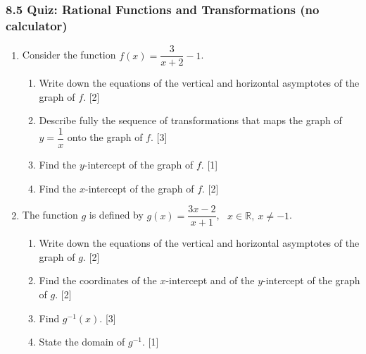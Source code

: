 \documentclass[12pt, twoside]{article}
\begin{document}
\newpage

\subsubsection*{8.5 Quiz: Rational Functions and Transformations (no calculator)}

\begin{enumerate}[itemsep=0.15cm]

\item[1.] [Maximum mark: 8]

Consider the function $f(x) = \dfrac{3}{x + 2} - 1$.

\begin{enumerate}[itemsep=0.15cm]
  \item Write down the equations of the vertical and horizontal asymptotes of the graph of $f$. \hfill [2]
  \item Describe fully the sequence of transformations that maps the graph of $y = \dfrac{1}{x}$ onto the graph of $f$. \hfill [3]
  \item Find the $y$-intercept of the graph of $f$. \hfill [1]
  \item Find the $x$-intercept of the graph of $f$. \hfill [2]
\end{enumerate}


\newpage

\item[2.] [Maximum mark: 8]

The function $g$ is defined by $g(x) = \dfrac{3x - 2}{x + 1}$, \ $x \in \mathbb{R}, \ x \ne -1$.

\begin{enumerate}[itemsep=0.15cm]
  \item Write down the equations of the vertical and horizontal asymptotes of the graph of $g$. \hfill [2]
  \item Find the coordinates of the $x$-intercept and of the $y$-intercept of the graph of $g$. \hfill [2]
  \item Find $g^{-1}(x)$. \hfill [3]
  \item State the domain of $g^{-1}$. \hfill [1]
\end{enumerate}


\end{enumerate}
\end{document}
